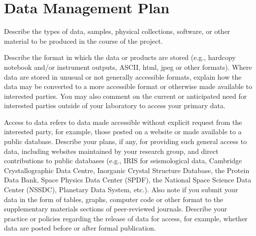 \section*{\hfil Data Management Plan \hfil}
\vspace{-16pt}
\noindent\hrulefill


 
\noindent Describe the types of data, samples, physical collections, software, or other material to be produced in the course of the project. 
 
 
 
\bigskip
{}
 
\noindent Describe the format in which the data or products are stored (e.g., hardcopy notebook and/or instrument outputs, ASCII, html, jpeg or other formats). Where data are stored in unusual or not generally accessible formats, explain how the data may be converted to a more accessible format or otherwise made available to interested parties. You may also comment on the current or anticipated need for interested parties outside of your laboratory to access your primary data. 
 
 
 
\bigskip
{}
 
\noindent Access to data refers to data made accessible without explicit request from the interested party, for example, those posted on a website or made available to a public database. Describe your plans, if any, for providing such general access to data, including websites maintained by your research group, and direct contributions to public databases (e.g., IRIS for seismological data, Cambridge Crystallographic Data Centre, Inorganic Crystal Structure Database, the Protein Data Bank, Space Physics Data Center (SPDF), the National Space Science Data Center (NSSDC), Planetary Data System, etc.). Also note if you submit your data in the form of tables, graphs, computer code or other format to the supplementary materials sections of peer-reviewed journals. Describe your practice or policies regarding the release of data for access, for example, whether data are posted before or after formal publication. 
 
